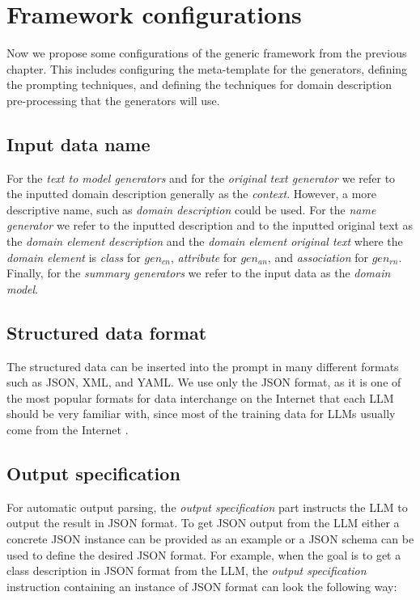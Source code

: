 \chapter{Framework configurations}
\label{chap:framework_configuration}

Now we propose some configurations of the generic framework from the previous chapter. This includes configuring the meta-template for the generators, defining the prompting techniques, and defining the techniques for domain description pre-processing that the generators will use.


\section{Input data name}

For the \emph{text to model generators} and for the \emph{original text generator} we refer to the inputted domain description generally as the \textit{context}. However, a more descriptive name, such as \textit{domain description} could be used.
For the \emph{name generator} we refer to the inputted description and to the inputted original text as the \textit{domain element description} and the \textit{domain element original text} where the \textit{domain element} is \textit{class} for $gen_{cn}$, \textit{attribute} for $gen_{an}$, and \textit{association} for $gen_{rn}$. Finally, for the \emph{summary generators} we refer to the input data as the \textit{domain model}.


\section{Structured data format}

The structured data can be inserted into the prompt in many different formats such as JSON, XML, and YAML. We use only the JSON format, as it is one of the most popular formats for data interchange on the Internet that each LLM should be very familiar with, since most of the training data for LLMs usually come from the Internet \cite{Zhao2023}.


\section{Output specification}

For automatic output parsing, the \emph{output specification} part instructs the LLM to output the result in JSON format. To get JSON output from the LLM either a concrete JSON instance can be provided as an example or a JSON schema can be used to define the desired JSON format. For example, when the goal is to get a class description in JSON format from the LLM, the \emph{output specification} instruction containing an instance of JSON format can look the following way: \\

